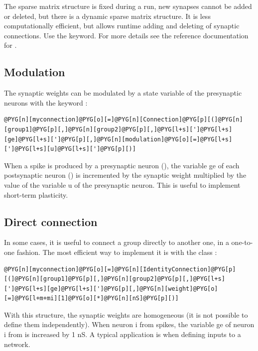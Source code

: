\documentclass[letterpaper,10pt,english]{manual}
\begin{document}
The sparse matrix structure is fixed during a run, new synapses cannot be added or deleted,
but there is a dynamic sparse matrix structure. It is less computationally efficient, but
allows runtime adding and deleting of synaptic connections. Use the 
keyword. For more details see the reference documentation for \hyperlink{brian.Connection}{}.


\subsection{Modulation}

The synaptic weights can be modulated by a state variable of the presynaptic neurons with
the keyword :

\begin{Verbatim}[commandchars=@\[\]]
@PYG[n][myconnection]@PYG[o][=]@PYG[n][Connection]@PYG[p][(]@PYG[n][group1]@PYG[p][,]@PYG[n][group2]@PYG[p][,]@PYG[l+s][']@PYG[l+s][ge]@PYG[l+s][']@PYG[p][,]@PYG[n][modulation]@PYG[o][=]@PYG[l+s][']@PYG[l+s][u]@PYG[l+s][']@PYG[p][)]
\end{Verbatim}

When a spike is produced by a presynaptic neuron (), the variable ge of each postsynaptic
neuron () is incremented by the synaptic weight multiplied by the value of the variable u
of the presynaptic neuron. This is useful to implement short-term plasticity.


\subsection{Direct connection}

In some cases, it is useful to connect a group directly to another one, in a one-to-one fashion.
The most efficient way to implement it is with the class \hyperlink{brian.IdentityConnection}{}:

\begin{Verbatim}[commandchars=@\[\]]
@PYG[n][myconnection]@PYG[o][=]@PYG[n][IdentityConnection]@PYG[p][(]@PYG[n][group1]@PYG[p][,]@PYG[n][group2]@PYG[p][,]@PYG[l+s][']@PYG[l+s][ge]@PYG[l+s][']@PYG[p][,]@PYG[n][weight]@PYG[o][=]@PYG[l+m+mi][1]@PYG[o][*]@PYG[n][nS]@PYG[p][)]
\end{Verbatim}

With this structure, the synaptic weights are homogeneous (it is not possible to define them
independently). When neuron i from  spikes, the variable ge of neuron i from 
is increased by 1 nS. A typical application is when defining inputs to a network.
\end{document}
